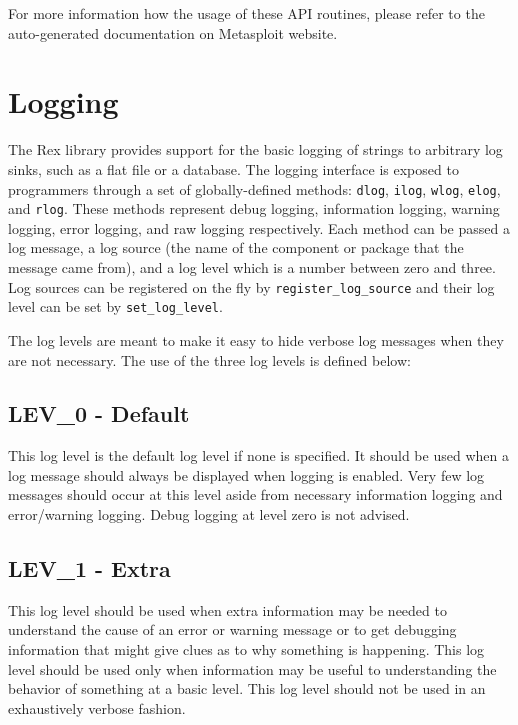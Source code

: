 \documentclass{report}
\begin{document}
\par
For more information how the usage of these API routines, please
refer to the auto-generated documentation on Metasploit website.

    \section{Logging}

\par
The Rex library provides support for the basic logging of strings to
arbitrary log sinks, such as a flat file or a database.  The logging
interface is exposed to programmers through a set of
globally-defined methods: \texttt{dlog}, \texttt{ilog},
\texttt{wlog}, \texttt{elog}, and \texttt{rlog}.  These methods
represent debug logging, information logging, warning logging, error
logging, and raw logging respectively.  Each method can be passed a
log message, a log source (the name of the component or package that
the message came from), and a log level which is a number between
zero and three.  Log sources can be registered on the fly by
\texttt{register\_log\_source} and their log level can be set by
\texttt{set\_log\_level}.

\par
The log levels are meant to make it easy to hide verbose log
messages when they are not necessary.  The use of the three log
levels is defined below:

        \subsection{LEV\_0 - Default}

This log level is the default log level if none is specified.  It
should be used when a log message should always be displayed when
logging is enabled. Very few log messages should occur at this level
aside from necessary information logging and error/warning logging.
Debug logging at level zero is not advised.

        \subsection{LEV\_1 - Extra}

This log level should be used when extra information may be needed
to understand the cause of an error or warning message or to get
debugging information that might give clues as to why something is
happening.  This log level should be used only when information may
be useful to understanding the behavior of something at a basic
level.  This log level should not be used in an exhaustively verbose
fashion.
\end{document}
